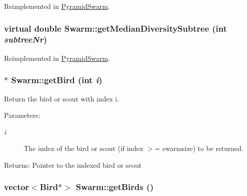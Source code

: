 Reimplemented in \hyperlink{classPyramidSwarm_d8028bde5aa6ba3440350e3c6cca959f}{PyramidSwarm}.\hypertarget{classSwarm_4f31a2aeda867e79eab25b1a108f1c6f}{
\subsubsection{\setlength{\rightskip}{0pt plus 5cm}virtual double Swarm::getMedianDiversitySubtree (int {\em subtreeNr})}}
\label{classSwarm_4f31a2aeda867e79eab25b1a108f1c6f}




Reimplemented in \hyperlink{classPyramidSwarm_d27c02e0ea3cad1e6ec3303bc64958e0}{PyramidSwarm}.\hypertarget{classSwarm_b762d426b74600501d4c80431df380a9}{
\subsubsection{ $\ast$ Swarm::getBird (int {\em i})}}
\label{classSwarm_b762d426b74600501d4c80431df380a9}


Return the bird or scout with index i. 

\begin{Desc}
\item[Parameters:]
\begin{description}
\item[{\em i}]The index of the bird or scout (if index $>$= swarmsize) to be returned. \end{description}
\end{Desc}
\begin{Desc}
\item[Returns:]Pointer to the indexed bird or scout \end{Desc}
\hypertarget{classSwarm_3459aae3e91fa3330ea467deccee3c13}{
\subsubsection{\setlength{\rightskip}{0pt plus 5cm}vector$<${\bf Bird}$\ast$$>$ Swarm::getBirds ()}}
\label{classSwarm_3459aae3e91fa3330ea467deccee3c13}


